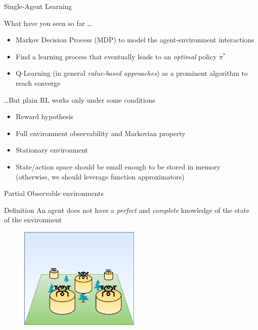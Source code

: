 \documentclass[presentation]{beamer}\mode<presentation>{\usetheme{AMSBolognaFC}}
\begin{document}
\begin{frame}[c, fragile]{Single-Agent Learning}
\begin{exampleblock}{What have you seen so far \dots}
	\begin{itemize}
		\item Markov Decision Process (MDP) to model the agent-environment interactions
		\item Find a learning process that eventually leads to an \emph{optimal} policy $\pi^*$
		\item Q-Learning (in general \emph{value-based approaches}) as a prominent algorithm to reach converge
	\end{itemize}
\end{exampleblock}
\begin{alertblock}{\dots But plain RL works only under some conditions}
	\begin{itemize}
		\item Reward hypothesis
		\item Full environment observability and Markovian property
		\item Stationary environment
		\item State/action space should be small enough to be stored in memory (otherwise, we should leverage function approximators)
	\end{itemize}	
\end{alertblock}
\end{frame}
\begin{frame}{Partial Observable environments}
	\begin{alertblock}{Definition}
		An agent does not have a \emph{perfect} and \emph{complete} knowledge of the state of the environment
	\end{alertblock}

	\begin{figure}
		\includegraphics[height=5cm]{img/challenge-partial-observable.pdf}
	\end{figure}
\end{frame}
\end{document}
